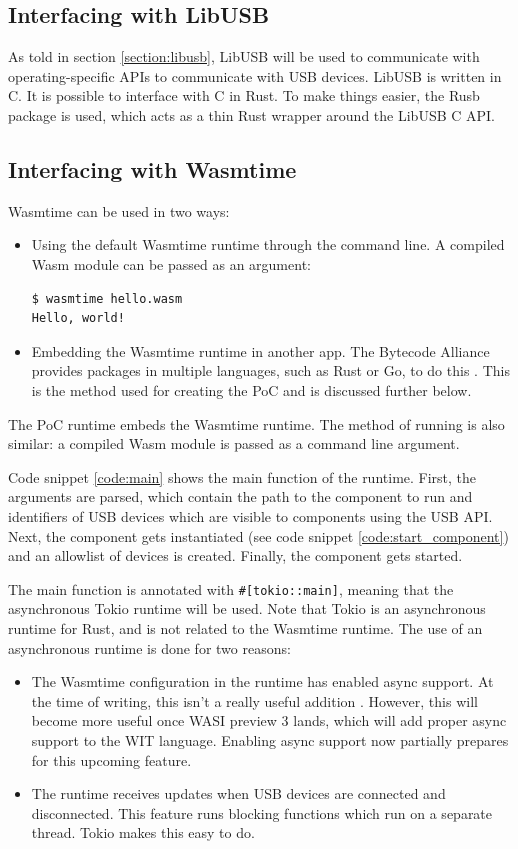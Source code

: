 \subsection{Interfacing with LibUSB}
As told in section \ref{section:libusb}, LibUSB will be used to communicate with operating-specific APIs to communicate with USB devices. LibUSB is written in C. It is possible to interface with C in Rust. To make things easier, the Rusb package is used, which acts as a thin Rust wrapper around the LibUSB C API.

\subsection{Interfacing with Wasmtime}
Wasmtime can be used in two ways: 
\begin{itemize}
\item Using the default Wasmtime runtime through the command line. A compiled \acrshort{Wasm} module can be passed as an argument:
\begin{verbatim}
$ wasmtime hello.wasm
Hello, world!
\end{verbatim}
\item Embedding the Wasmtime runtime in another app. The Bytecode Alliance provides packages in multiple languages, such as Rust or Go, to do this \cite{wasmtime_website}. This is the method used for creating the \acrshort{PoC} and is discussed further below.
\end{itemize}

The \acrshort{PoC} runtime embeds the Wasmtime runtime. The method of running is also similar: a compiled \acrshort{Wasm} module is passed as a command line argument.

Code snippet \ref{code:main} shows the main function of the runtime. First, the arguments are parsed, which contain the path to the component to run and identifiers of USB devices which are visible to components using the \acrshort{USB} \acrshort{API}. Next, the component gets instantiated (see code snippet \ref{code:start_component}) and an allowlist of devices is created. Finally, the component gets started.

The main function is annotated with \texttt{\#[tokio::main]}, meaning that the asynchronous Tokio runtime \cite{tokio} will be used. Note that Tokio is an asynchronous runtime for Rust, and is not related to the Wasmtime runtime. The use of an asynchronous runtime is done for two reasons:
\begin{itemize}
\item The Wasmtime configuration in the runtime has enabled async support. At the time of writing, this isn't a really useful addition \cite{wasmtime_async_config}. However, this will become more useful once \acrshort{WASI} preview 3 lands, which will add proper async support to the \acrshort{WIT} language. Enabling async support now partially prepares for this upcoming feature.

\item The runtime receives updates when USB devices are connected and disconnected. This feature runs blocking functions which run on a separate thread. Tokio makes this easy to do.\\
\end{itemize}


